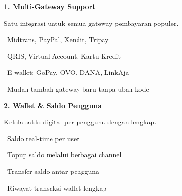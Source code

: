 \documentclass[a4paper]{article}
\begin{document}
\noindent
\begin{minipage}[t]{0.485\textwidth}
    \colorbox{GreenPrimary}{%
        \begin{minipage}{\dimexpr\textwidth-2\fboxsep\relax}
            {\fontsize{10}{13}\selectfont\bfseries\color{White} 1. Multi-Gateway Support}
        \end{minipage}}\par
    \vspace{4pt}
    {\fontsize{9}{12}\selectfont\color{TextDark}%
    Satu integrasi untuk semua gateway pembayaran populer.\par\vspace{3pt}
    \textbullet\ Midtrans, PayPal, Xendit, Tripay\par\vspace{2pt}%
    \textbullet\ QRIS, Virtual Account, Kartu Kredit\par\vspace{2pt}%
    \textbullet\ E-wallet: GoPay, OVO, DANA, LinkAja\par\vspace{2pt}%
    \textbullet\ Mudah tambah gateway baru tanpa ubah kode}%
\end{minipage}%
\hfill
\begin{minipage}[t]{0.485\textwidth}
    \colorbox{BluePrimary}{%
        \begin{minipage}{\dimexpr\textwidth-2\fboxsep\relax}
            {\fontsize{10}{13}\selectfont\bfseries\color{White} 2. Wallet \& Saldo Pengguna}
        \end{minipage}}\par
    \vspace{4pt}
    {\fontsize{9}{12}\selectfont\color{TextDark}%
    Kelola saldo digital per pengguna dengan lengkap.\par\vspace{3pt}
    \textbullet\ Saldo real-time per user\par\vspace{2pt}%
    \textbullet\ Topup saldo melalui berbagai channel\par\vspace{2pt}%
    \textbullet\ Transfer saldo antar pengguna\par\vspace{2pt}%
    \textbullet\ Riwayat transaksi wallet lengkap}%
\end{minipage}

\vspace{8pt}
\end{document}
